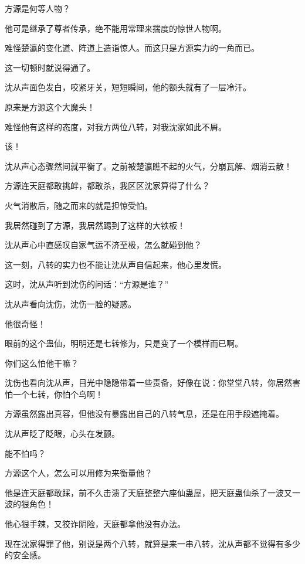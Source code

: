 \begin{this_body}
方源是何等人物？

他可是继承了尊者传承，绝不能用常理来揣度的惊世人物啊。

难怪楚瀛的变化道、阵道上造诣惊人。而这只是方源实力的一角而已。

这一切顿时就说得通了。

沈从声面色发白，咬紧牙关，短短瞬间，他的额头就有了一层冷汗。

原来是方源这个大魔头！

难怪他有这样的态度，对我方两位八转，对我沈家如此不屑。

该！

沈从声心态骤然间就平衡了。之前被楚瀛瞧不起的火气，分崩瓦解、烟消云散！

方源连天庭都敢挑衅，都敢杀，我区区沈家算得了什么？

火气消散后，随之而来的就是担惊受怕。

我居然碰到了方源，我居然踢到了这样的大铁板！

沈从声心中直感叹自家气运不济至极，怎么就碰到他？

这一刻，八转的实力也不能让沈从声自信起来，他心里发慌。

这时，沈从声听到沈伤的问话：“方源是谁？”

沈从声看向沈伤，沈伤一脸的疑惑。

他很奇怪！

眼前的这个蛊仙，明明还是七转修为，只是变了一个模样而已啊。

你们这么怕他干嘛？

沈伤也看向沈从声，目光中隐隐带着一些责备，好像在说：你堂堂八转，你居然害怕一个七转，你怕个鸟啊！

方源虽然露出真容，但他没有暴露出自己的八转气息，还是在用手段遮掩着。

沈从声眨了眨眼，心头在发颤。

能不怕吗？

方源这个人，怎么可以用修为来衡量他？

他是连天庭都敢踩，前不久击溃了天庭整整六座仙蛊屋，把天庭蛊仙杀了一波又一波的狠角色！

他心狠手辣，又狡诈阴险，天庭都拿他没有办法。

现在沈家得罪了他，别说是两个八转，就算是来一串八转，沈从声都不觉得有多少的安全感。

\end{this_body}

